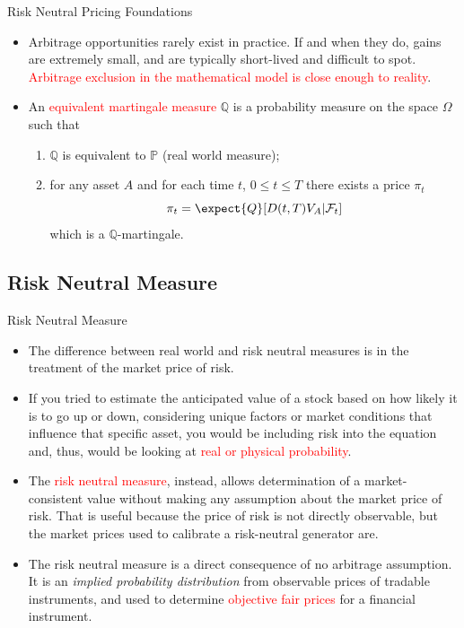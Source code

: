 \documentclass{beamer}
\begin{document}
\begin{frame}{Risk Neutral Pricing Foundations}
	\begin{itemize}
		\item Arbitrage opportunities rarely exist in practice. If and when they do, gains are extremely small, and are typically short-lived and difficult to spot. \textcolor{red}{Arbitrage exclusion in the mathematical model is close enough to reality}.
		\item An \textcolor{red}{equivalent martingale measure} $\mathbb{Q}$ is a probability measure on the space $\Omega$ such that
		\begin{enumerate}
			\item $\mathbb{Q}$ is equivalent to $\mathbb{P}$ (real world measure);
			\item for any asset $A$ and for each time $t$, $0\le t\le T$ there exists a price $\pi_t$
			\begin{equation*}
				\pi_t = \expect{Q}[D(t,T)V_A|\mathcal{F}_t]
			\end{equation*}
			which is a $\mathbb{Q}$-martingale.
		\end{enumerate}
	\end{itemize}
\end{frame}

\subsection{Risk Neutral Measure}
\begin{frame}{Risk Neutral Measure}
\begin{itemize}
\item  The difference between real world and risk neutral measures is in the treatment of the market price of risk.
\item If you tried to estimate the anticipated value of a stock based on how likely it is to go up or down, considering unique factors or market conditions that influence that specific asset, you would be including risk into the equation and, thus, would be looking at \textcolor{red}{real or physical probability}.
\item The \textcolor{red}{risk neutral measure}, instead, allows determination of a market-consistent value without making any assumption about the market price of risk. That is useful because the price of risk is not directly observable, but the market prices used to calibrate a risk-neutral generator are.
\item The risk neutral measure is a direct consequence of no arbitrage assumption. It is an \emph{implied probability distribution} from observable prices of tradable instruments, and used to determine \textcolor{red}{objective fair prices} for a financial instrument.
\end{itemize}
\end{frame}
\end{document}
